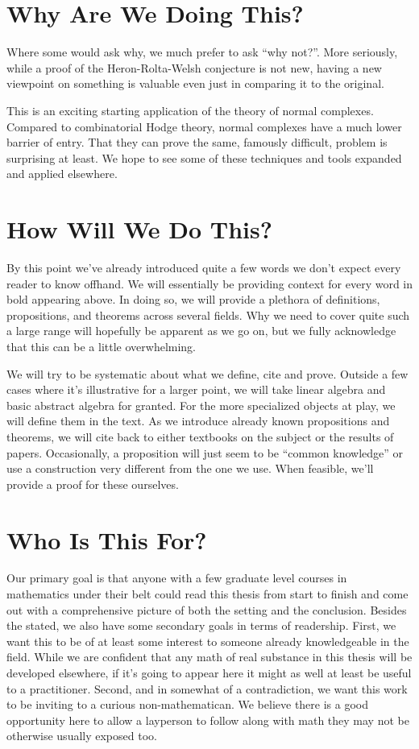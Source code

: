 \documentclass[12pt,oneside]{../../sfsuthesis}
\begin{document}
\section{Why Are We Doing This?}

Where some would ask why, we much prefer to ask ``why not?''.
More seriously, while a proof of the Heron-Rolta-Welsh conjecture is not new, having a new viewpoint on something is valuable even just in comparing it to the original.

This is an exciting starting application of the theory of normal complexes.
Compared to combinatorial Hodge theory, normal complexes have a much lower barrier of entry.
That they can prove the same, famously difficult, problem is surprising at least.
We hope to see some of these techniques and tools expanded and applied elsewhere.

\section{How Will We Do This?}

By this point we've already introduced quite a few words we don't expect every reader to know offhand.
We will essentially be providing context for every word in bold appearing above.
In doing so, we will provide a plethora of definitions, propositions, and theorems across several fields.
Why we need to cover quite such a large range will hopefully be apparent as we go on, but we fully acknowledge that this can be a little overwhelming.

We will try to be systematic about what we define, cite and prove.
Outside a few cases where it's illustrative for a larger point, we will take linear algebra and basic abstract algebra for granted.
For the more specialized objects at play, we will define them in the text.
As we introduce already known propositions and theorems, we will cite back to either textbooks on the subject or the results of papers.
Occasionally, a proposition will just seem to be ``common knowledge'' or use a construction very different from the one we use.
When feasible, we'll provide a proof for these ourselves.

\section{Who Is This For?}

Our primary goal is that anyone with a few graduate level courses in mathematics under their belt could read this thesis from start to finish and come out with a comprehensive picture of both the setting and the conclusion.
Besides the stated, we also have some secondary goals in terms of readership.
First, we want this to be of at least some interest to someone already knowledgeable in the field.
While we are confident that any math of real substance in this thesis will be developed elsewhere, if it's going to appear here it might as well at least be useful to a practitioner.
Second, and in somewhat of a contradiction, we want this work to be inviting to a curious non-mathematican.
We believe there is a good opportunity here to allow a layperson to follow along with math they may not be otherwise usually exposed too.
\end{document}
